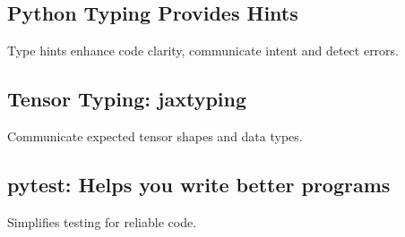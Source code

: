 \subsection{Python Typing Provides Hints}
\begin{notes}
    Type hints enhance code clarity, communicate intent and detect errors. 
\end{notes}

\subsection{Tensor Typing: jaxtyping}
\begin{notes}
    Communicate expected tensor shapes and data types. 
\end{notes}

\subsection{pytest: Helps you write better programs}
\begin{notes}
    Simplifies testing for reliable code.
\end{notes}


